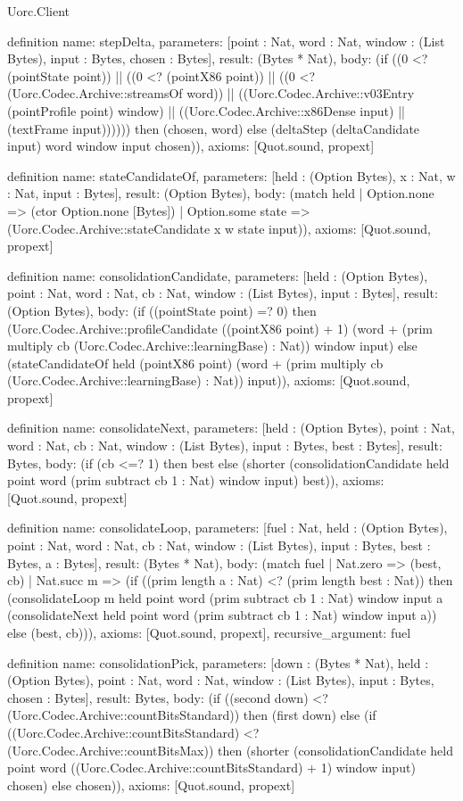 \begin{lexlean}{Uorc.Client}
\begin{semanticmodule}
definition{
  name: stepDelta,
  parameters: [point : Nat, word : Nat, window : (List Bytes), input : Bytes, chosen : Bytes],
  result: (Bytes * Nat),
  body: (if ((0 <? (pointState point)) || ((0 <? (pointX86 point)) || ((0 <? (Uorc.Codec.Archive::streamsOf word)) || ((Uorc.Codec.Archive::v03Entry (pointProfile point) window) || ((Uorc.Codec.Archive::x86Dense input) || (textFrame input)))))) then (chosen, word) else (deltaStep (deltaCandidate input) word window input chosen)),
  axioms: [Quot.sound, propext]
}

definition{
  name: stateCandidateOf,
  parameters: [held : (Option Bytes), x : Nat, w : Nat, input : Bytes],
  result: (Option Bytes),
  body: (match held
    | Option.none => (ctor Option.none [Bytes])
    | Option.some state => (Uorc.Codec.Archive::stateCandidate x w state input)),
  axioms: [Quot.sound, propext]
}

definition{
  name: consolidationCandidate,
  parameters: [held : (Option Bytes), point : Nat, word : Nat, cb : Nat, window : (List Bytes), input : Bytes],
  result: (Option Bytes),
  body: (if ((pointState point) =? 0) then (Uorc.Codec.Archive::profileCandidate ((pointX86 point) + 1) (word + (prim multiply cb (Uorc.Codec.Archive::learningBase) : Nat)) window input) else (stateCandidateOf held (pointX86 point) (word + (prim multiply cb (Uorc.Codec.Archive::learningBase) : Nat)) input)),
  axioms: [Quot.sound, propext]
}

definition{
  name: consolidateNext,
  parameters: [held : (Option Bytes), point : Nat, word : Nat, cb : Nat, window : (List Bytes), input : Bytes, best : Bytes],
  result: Bytes,
  body: (if (cb <=? 1) then best else (shorter (consolidationCandidate held point word (prim subtract cb 1 : Nat) window input) best)),
  axioms: [Quot.sound, propext]
}

definition{
  name: consolidateLoop,
  parameters: [fuel : Nat, held : (Option Bytes), point : Nat, word : Nat, cb : Nat, window : (List Bytes), input : Bytes, best : Bytes, a : Bytes],
  result: (Bytes * Nat),
  body: (match fuel
    | Nat.zero => (best, cb)
    | Nat.succ m => (if ((prim length a : Nat) <? (prim length best : Nat)) then (consolidateLoop m held point word (prim subtract cb 1 : Nat) window input a (consolidateNext held point word (prim subtract cb 1 : Nat) window input a)) else (best, cb))),
  axioms: [Quot.sound, propext],
  recursive_argument: fuel
}

definition{
  name: consolidationPick,
  parameters: [down : (Bytes * Nat), held : (Option Bytes), point : Nat, word : Nat, window : (List Bytes), input : Bytes, chosen : Bytes],
  result: Bytes,
  body: (if ((second down) <? (Uorc.Codec.Archive::countBitsStandard)) then (first down) else (if ((Uorc.Codec.Archive::countBitsStandard) <? (Uorc.Codec.Archive::countBitsMax)) then (shorter (consolidationCandidate held point word ((Uorc.Codec.Archive::countBitsStandard) + 1) window input) chosen) else chosen)),
  axioms: [Quot.sound, propext]
}


\end{semanticmodule}
\end{lexlean}
